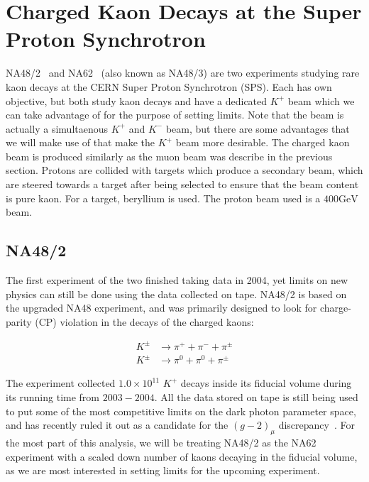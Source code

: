 \section{Charged Kaon Decays at the Super Proton Synchrotron}
\label{sec:na48_na62_experiment}
NA48/2~\cite{Batley:1999fv} and NA62~\cite{Martellotti:2015kna} (also known as NA48/3) are two experiments studying rare kaon decays at the CERN Super Proton Synchrotron (SPS).
Each has own objective, but both study kaon decays and have a dedicated $K^+$ beam which we can take advantage of for the purpose of setting limits.
Note that the beam is actually a simultaenous $K^+$ and $K^-$ beam, but there are some advantages that we will make use of that make the $K^+$ beam more desirable.
The charged kaon beam is produced similarly as the muon beam was describe in the previous section.
Protons are collided with targets which produce a secondary beam, which are steered towards a target after being selected to ensure that the beam content is pure kaon.
For a target, beryllium is used.
The proton beam used is a $400\textrm{GeV}$ beam.

\subsection{NA48/2}
The first experiment of the two finished taking data in 2004, yet limits on new physics can still be done using the data collected on tape.
NA48/2 is based on the upgraded NA48 experiment, and was primarily designed to look for charge-parity (CP) violation in the decays of the charged kaons:

\begin{align}
K^\pm & \rightarrow \pi^+ + \pi^- + \pi^\pm \\
K^\pm & \rightarrow \pi^0 + \pi^0 + \pi^\pm
\end{align}

The experiment collected $1.0 \times 10^{11}$ $K^+$ decays inside its fiducial volume during its running time from $2003-2004$.
All the data stored on tape is still being used to put some of the most competitive limits on the dark photon parameter space, and has recently ruled it out as a candidate for the $(g-2)_\mu$ discrepancy~\cite{Goudzovski:2014rwa}.
For the most part of this analysis, we will be treating NA48/2 as the NA62 experiment with a scaled down number of kaons decaying in the fiducial volume, as we are most interested in setting limits for the upcoming experiment.


